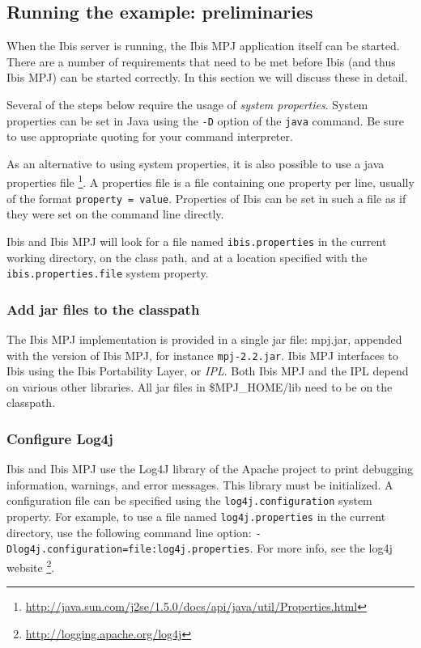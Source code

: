 \documentclass[a4paper,10pt]{article}
\begin{document}
\subsection{Running the example: preliminaries}

When the Ibis server is running, the Ibis MPJ application itself can be
started.  There are a number of requirements that need to be met before
Ibis (and thus Ibis MPJ) can be started correctly.
In this section we will discuss these in detail.

Several of the steps below require the usage of \emph{system properties}.
System properties can be set in Java using the \texttt{-D} option of the
\texttt{java} command. Be sure to use appropriate quoting for your
command interpreter.

As an alternative to using system properties, it is also possible to use
a java properties file
\footnote{\url{http://java.sun.com/j2se/1.5.0/docs/api/java/util/Properties.html}}.
A properties file is a file containing one property per line, usually of
the format \texttt{property = value}. Properties of Ibis can be set in
such a file as if they were set on the command line directly.

Ibis and Ibis MPJ will look for a file named \texttt{ibis.properties} in the
current working directory, on the class path, and at a location specified
with the \texttt{ibis.properties.file} system property.

\subsubsection{Add jar files to the classpath}

The Ibis MPJ implementation is provided in a single jar file: mpj.jar,
appended with the version of Ibis MPJ, for instance \texttt{mpj-2.2.jar}.
Ibis MPJ interfaces to Ibis using the Ibis Portability Layer, or
\emph{IPL}. Both Ibis MPJ and the IPL depend on various other libraries.
All jar files in \$MPJ\_HOME/lib need to be on the classpath.

\subsubsection{Configure Log4j}

Ibis and Ibis MPJ use the Log4J library of the Apache project to print debugging
information, warnings, and error messages. This library must be
initialized. A configuration file can be specified using the
\texttt{log4j.configuration} system property. For example, to use a file
named \texttt{log4j.properties} in the current directory, use the
following command line option:
\texttt{-Dlog4j.configuration=file:log4j.properties}. For more info,
see the log4j website \footnote{\url{http://logging.apache.org/log4j}}.
\end{document}
